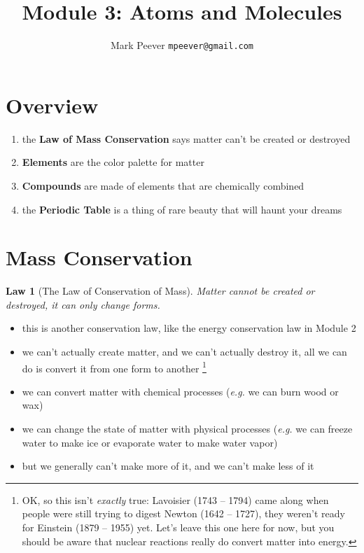 \documentclass[11pt, oneside]{article}   	%
\title{Module 3: Atoms and Molecules }
\author{Mark Peever \texttt{mpeever@gmail.com}}
\newtheorem{law}{Law}
\begin{document}
\maketitle

\begin{center}

\end{center}

\section{Overview}
\begin{enumerate}
\item the \textbf{Law of Mass Conservation} says matter can't be created or destroyed
\item \textbf{Elements} are the color palette for matter
\item \textbf{Compounds} are made of elements that are chemically combined
\item the \textbf{Periodic Table} is a thing of rare beauty that will haunt your dreams
\end{enumerate}

\section{Mass Conservation}

\begin{law}[The Law of Conservation of Mass]
Matter cannot be created or destroyed, it can only change forms.
\end{law}

\begin{itemize}
\item this is another conservation law, like the energy conservation law in Module 2
\item we can't actually create matter, and we can't actually destroy it, all we can do is convert it from one form to another
\footnote{OK, so this isn't \emph{exactly} true: Lavoisier (1743 -- 1794) came along when people were still trying to digest Newton (1642 -- 1727), they weren't ready for Einstein (1879 -- 1955) yet. Let's leave this one here for now, but you should be aware that nuclear reactions really do convert matter into energy.}
\item we can convert matter with chemical processes (\emph{e.g.} we can burn wood or wax)
\item we can change the state of matter with physical processes (\emph{e.g.} we can freeze water to make ice or evaporate water to make water vapor)
\item but we generally can't make more of it, and we can't make less of it
\end{itemize}
\end{document}

